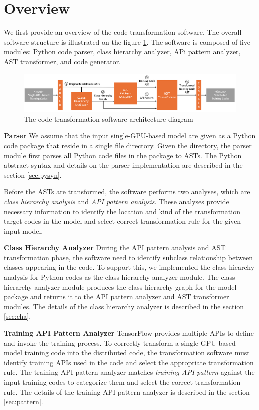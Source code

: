 \section{Overview}

We first provide an overview of the code transformation software.
The overall software structure is illustrated on the figure \ref{sysarch}.
The software is composed of five modules: Python code parser,
class hierarchy analyzer, APi pattern analyzer, AST transformer,
and code generator.

\begin{figure}
  \includegraphics[width=1\textwidth]{system_arch}
  \caption{The code transformation software architecture diagram}
  \label{sysarch}
\end{figure}

\textbf{Parser}
We assume that the input single-GPU-based model are given as a Python code
package that reside in a single file directory.
Given the directory, the parser module first parses all Python code files
in the package to ASTs.
The Python abstract syntax and details on the parser implementation
are described in the section \ref{sec:pysyn}.

Before the ASTs are transformed, the software performs two analyses, 
which are \textit{class hierarchy analysis} and 
\textit{API pattern analysis}.
These analyses provide necessary information to identify the
location and kind of the transformation target codes in the model
and select correct transformation rule for the given input model.

\textbf{Class Hierarchy Analyzer}
During the API pattern analysis and AST transformation phase,
the software need to identify subclass relationship between
classes appearing in the code.
To support this, we implemented the class hiearchy analysis
for Python codes as the class hierarchy analyzer module.
The class hierarchy analyzer module produces the class hierarchy graph
for the model package and returns it to the API pattern analyzer and 
AST transformer modules. The details of the class hierarchy analyzer is
described in the section \ref{sec:cha}.

\textbf{Training API Pattern Analyzer}
TensorFlow provides multiple APIs to define and invoke the training process.
To correctly transform a single-GPU-based model training code into
the distributed code, the transformation software must identify
training APIs used in the code and select the appropriate transformation rule.
The training API pattern analyzer matches \textit{training API pattern}
against the input training codes to categorize them and select
the correct transformation rule. The details of the training API pattern
analyzer is described in the section \ref{sec:pattern}.


